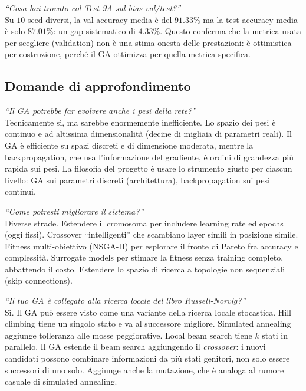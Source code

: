 \documentclass[11pt,a4paper]{article}
\begin{document}
\begin{domanda}
\textit{``Cosa hai trovato col Test 9A sul bias val/test?''}\\
Su $10$ seed diversi, la val accuracy media è del $91.33\%$ ma la test
accuracy media è solo $87.01\%$: un gap sistematico di $4.33\%$. Questo
conferma che la metrica usata per scegliere (validation) non è una
stima onesta delle prestazioni: è ottimistica per costruzione, perché il
GA ottimizza per quella metrica specifica.
\end{domanda}

\subsection{Domande di approfondimento}

\begin{domanda}
\textit{``Il GA potrebbe far evolvere anche i pesi della rete?''}\\
Tecnicamente sì, ma sarebbe enormemente inefficiente. Lo spazio dei
pesi è continuo e ad altissima dimensionalità (decine di migliaia di
parametri reali). Il GA è efficiente su spazi discreti e di dimensione
moderata, mentre la backpropagation, che usa l'informazione del
gradiente, è ordini di grandezza più rapida sui pesi. La filosofia del
progetto è usare lo strumento giusto per ciascun livello: GA sui
parametri discreti (architettura), backpropagation sui pesi continui.
\end{domanda}

\begin{domanda}
\textit{``Come potresti migliorare il sistema?''}\\
Diverse strade. Estendere il cromosoma per includere learning rate ed
epochs (oggi fissi). Crossover ``intelligenti'' che scambiano layer simili
in posizione simile. Fitness multi-obiettivo (NSGA-II) per esplorare il
fronte di Pareto fra accuracy e complessità. Surrogate models per
stimare la fitness senza training completo, abbattendo il costo. Estendere
lo spazio di ricerca a topologie non sequenziali (skip connections).
\end{domanda}

\begin{domanda}
\textit{``Il tuo GA è collegato alla ricerca locale del libro Russell-Norvig?''}\\
Sì. Il GA può essere visto come una variante della ricerca locale
stocastica. Hill climbing tiene un singolo stato e va al successore
migliore. Simulated annealing aggiunge tolleranza alle mosse
peggiorative. Local beam search tiene $k$ stati in parallelo. Il GA
estende il beam search aggiungendo il \emph{crossover}: i nuovi
candidati possono combinare informazioni da più stati genitori, non
solo essere successori di uno solo. Aggiunge anche la mutazione, che è
analoga al rumore casuale di simulated annealing.
\end{domanda}
\end{document}
